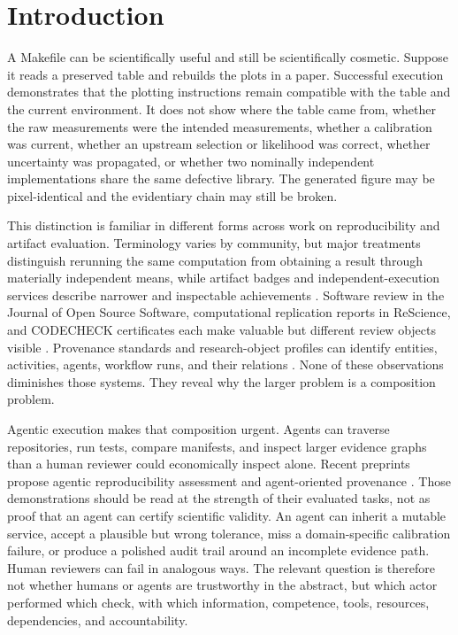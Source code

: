 \documentclass[11pt]{article}
\begin{document}
\section{Introduction}

A Makefile can be scientifically useful and still be scientifically cosmetic. Suppose it reads a preserved table and rebuilds the plots in a paper. Successful execution demonstrates that the plotting instructions remain compatible with the table and the current environment. It does not show where the table came from, whether the raw measurements were the intended measurements, whether a calibration was current, whether an upstream selection or likelihood was correct, whether uncertainty was propagated, or whether two nominally independent implementations share the same defective library. The generated figure may be pixel-identical and the evidentiary chain may still be broken.

This distinction is familiar in different forms across work on reproducibility and artifact evaluation. Terminology varies by community, but major treatments distinguish rerunning the same computation from obtaining a result through materially independent means, while artifact badges and independent-execution services describe narrower and inspectable achievements \citep{nasem-reproducibility-2019,acm-artifact-badging-2020,nust-codecheck-2021}. Software review in the Journal of Open Source Software, computational replication reports in ReScience, and CODECHECK certificates each make valuable but different review objects visible \citep{smith-joss-2018,rougier-rescience-2017,nust-codecheck-2021}. Provenance standards and research-object profiles can identify entities, activities, agents, workflow runs, and their relations \citep{w3c-prov-o-2013,khan-cwlprov-2019,ro-crate-1.2,workflow-run-ro-crate-2024}. None of these observations diminishes those systems. They reveal why the larger problem is a composition problem.

Agentic execution makes that composition urgent. Agents can traverse repositories, run tests, compare manifests, and inspect larger evidence graphs than a human reviewer could economically inspect alone. Recent preprints propose agentic reproducibility assessment and agent-oriented provenance \citep{ara-2026,prov-agent-2025}. Those demonstrations should be read at the strength of their evaluated tasks, not as proof that an agent can certify scientific validity. An agent can inherit a mutable service, accept a plausible but wrong tolerance, miss a domain-specific calibration failure, or produce a polished audit trail around an incomplete evidence path. Human reviewers can fail in analogous ways. The relevant question is therefore not whether humans or agents are trustworthy in the abstract, but which actor performed which check, with which information, competence, tools, resources, dependencies, and accountability.
\end{document}
